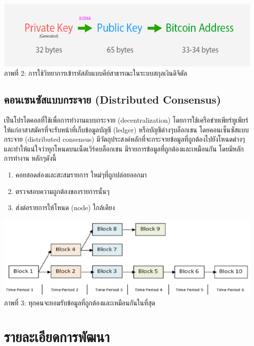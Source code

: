 \documentclass[letterpaper, 10pt, conference]{ieeeconf}
\begin{document}
	{\centering 
		\includegraphics[scale=0.55]{related-work-2} \\
		ภาพที่ 2: การใช้วิทยาการเข้ารหัสลับแบบคีย์สาธารณะในระบบสกุลเงินดิจิตัล \par 
	}

\subsection{คอนเซนซัสแบบกระจาย (Distributed Consensus)}

	\par เป็นโปรโตคอลที่ใช้เพื่อการทำงานแบบกระจาย (decentralization) โดยการใช้เครือข่ายเพียร์ทูเพียร์ ให้แก่อาสาสมัครที่จะรับหน้าที่เก็บข้อมูลบัญชี (ledger) หรือบัญชีต่างๆบล็อกเชน โดยคอนเซ็นซัสแบบกระจาย (distributed consensus) มีวัตถุประสงค์หลักที่จะกระจายข้อมูลที่ถูกต้องไปยังโหนดต่างๆ และทำให้แน่ใจว่าทุกโหนดบนเน็ตเวิร์คบล็อกเชน มีรายการข้อมูลที่ถูกต้องและเหมือนกัน โดยมีหลักการทำงาน หลักๆดังนี้

	\begin{enumerate}
		\item คอยสอดส่องและสะสมรายการ ใหม่ๆที่ถูกปล่อยออกมา
		\item ตรวจสอบความถูกต้องของรายการนั้นๆ
		\item ส่งต่อรายการให้โหนด (node) ใกล้เคียง
	\end{enumerate}
	\medskip

	{\centering 
		\includegraphics[scale=0.3]{related-work-3} \\
		ภาพที่ 3: ทุกคนจะยอมรับข้อมูลที่ถูกต้องและเหมือนกันในที่สุด \par 
	}

\section{รายละเอียดการพัฒนา}
\end{document}
